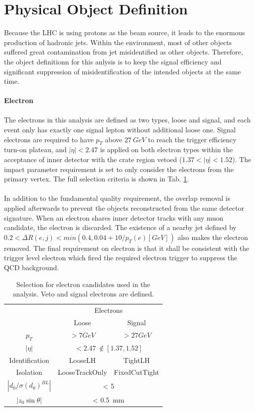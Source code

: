 \section{Physical Object Definition}
Because the LHC is using protons as the beam source, it leads to the enormous production of hadronic jets. Within the environment, most of other objects suffered great contamination from jet misidentified as other objects. Therefore, the object definitionn for this anlysis is to keep the signal efficiency and significant suppression of misidentification of the intended objects at the same time. 
\\
\\{\bf Electron}
\\
\\The electrons in this analysis are defined as two types, loose and signal, and each event only has exactly one signal lepton without additional loose one. Signal electrons are required to have $p_{T}$ above $27~GeV$ to reach the trigger efficiency turn-on plateau, and $|\eta|<2.47$ is applied on both electron types within the acceptance of inner detector with the crate region vetoed ($1.37<|\eta|<1.52$). The impact parameter requirement is set to only consider the electrons from the primary vertex. The full selection criteria is shown in Tab. \ref{Tab:eledefin}. 
\\
\\In addition to the fundamental quality requirement, the overlap removal is applied afterwards to prevent the objects reconstructed from the same detector signature. When an electron shares inner detector tracks with any muon candidate, the electron is discarded. The existence of a nearby jet defined by $0.2<\Delta R(e,j)<min(0.4,0.04+10/p_{T}(e)[GeV])$ also makes the electron removed. The final requirement on electron is that it shall be consistent with the trigger level electron which fired the required electron trigger to suppress the QCD background. 
\begin{table}[htb]
	\caption{Selection for electron candidates used in the analysis. Veto and signal electrons are defined.}\label{Tab:eledefin}
	\centering
	\begin{tabular}{|c||c|c|}
		\hline
		& \multicolumn{2}{c|}{ Electrons}\\
		&   Loose & Signal \\
		\hline
		$p_T$ & $>7GeV$ & $>27GeV$  \\
		\hline
		$| \eta |$ &  \multicolumn{2}{c|}{ $< 2.47 ~ \notin [1.37,1.52]$ } \\
		\hline
		Identification & LooseLH & TightLH   \\
		\hline
		Isolation       &   LooseTrackOnly & FixedCutTight  \\
		\hline
		$|d_0/\sigma(d_0)^{BL}|$ &   \multicolumn{2}{|c|}{  < 5}  \\
		\hline
		$|z_0\sin\theta| $  & \multicolumn{2}{|c|}{< 0.5~mm}  \\
		\hline
	\end{tabular}
\end{table}
